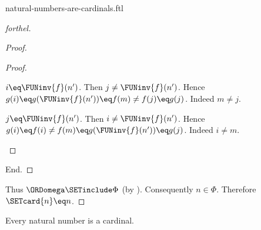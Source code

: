\documentclass{naproche-library}
\begin{document}
\begin{smodule}[title=Natural Numbers are Cardinal Numbers]{natural-numbers-are-cardinals.ftl}
\begin{proof}[forthel]
\begin{proof}
\begin{proof}
        \begin{case}{$i \eq \FUNinv{f}(n')$.}
          Then $j \neq \FUNinv{f}(n')$.
          Hence $g(i)
            \eq g(\FUNinv{f}(n'))
            \eq f(m)
            \neq f(j)
            \eq g(j)$.
          Indeed $m \neq j$.
        \end{case}

        \begin{case}{$j \eq \FUNinv{f}(n')$.}
          Then $i \neq \FUNinv{f}(n')$.
          Hence $g(i)
            \eq f(i)
            \neq f(m)
            \eq g(\FUNinv{f}(n'))
            \eq g(j)$.
          Indeed $i \neq m$.
        \end{case}
      \end{proof}
    End.
  \end{proof}

  Thus $\ORDomega \SETinclude \Phi$ (by ).
  Consequently $n \in \Phi$.
  Therefore $\SETcard{n} \eq n$.
\end{proof}

\begin{corollary}[forthel,id=SET_THEORY_07_7061392098066432]
  Every natural number is a cardinal.
\end{corollary}
\end{smodule}
\end{document}
